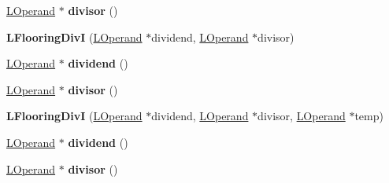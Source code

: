\begin{DoxyCompactItemize}
\item 
\hyperlink{classv8_1_1internal_1_1_l_operand}{L\+Operand} $\ast$ {\bfseries divisor} ()\hypertarget{classv8_1_1internal_1_1_l_flooring_div_i_a08339949c5e8e7eeaaa718262a80085f}{}\label{classv8_1_1internal_1_1_l_flooring_div_i_a08339949c5e8e7eeaaa718262a80085f}

\item 
{\bfseries L\+Flooring\+DivI} (\hyperlink{classv8_1_1internal_1_1_l_operand}{L\+Operand} $\ast$dividend, \hyperlink{classv8_1_1internal_1_1_l_operand}{L\+Operand} $\ast$divisor)\hypertarget{classv8_1_1internal_1_1_l_flooring_div_i_a88e21c324c7b5a3f91e6139b24c0301f}{}\label{classv8_1_1internal_1_1_l_flooring_div_i_a88e21c324c7b5a3f91e6139b24c0301f}

\item 
\hyperlink{classv8_1_1internal_1_1_l_operand}{L\+Operand} $\ast$ {\bfseries dividend} ()\hypertarget{classv8_1_1internal_1_1_l_flooring_div_i_aa8325f9821019c14c21d3db92a6e27bb}{}\label{classv8_1_1internal_1_1_l_flooring_div_i_aa8325f9821019c14c21d3db92a6e27bb}

\item 
\hyperlink{classv8_1_1internal_1_1_l_operand}{L\+Operand} $\ast$ {\bfseries divisor} ()\hypertarget{classv8_1_1internal_1_1_l_flooring_div_i_a08339949c5e8e7eeaaa718262a80085f}{}\label{classv8_1_1internal_1_1_l_flooring_div_i_a08339949c5e8e7eeaaa718262a80085f}

\item 
{\bfseries L\+Flooring\+DivI} (\hyperlink{classv8_1_1internal_1_1_l_operand}{L\+Operand} $\ast$dividend, \hyperlink{classv8_1_1internal_1_1_l_operand}{L\+Operand} $\ast$divisor, \hyperlink{classv8_1_1internal_1_1_l_operand}{L\+Operand} $\ast$temp)\hypertarget{classv8_1_1internal_1_1_l_flooring_div_i_ac86b4e7af079084e1bf5758a9c9ecef1}{}\label{classv8_1_1internal_1_1_l_flooring_div_i_ac86b4e7af079084e1bf5758a9c9ecef1}

\item 
\hyperlink{classv8_1_1internal_1_1_l_operand}{L\+Operand} $\ast$ {\bfseries dividend} ()\hypertarget{classv8_1_1internal_1_1_l_flooring_div_i_aa8325f9821019c14c21d3db92a6e27bb}{}\label{classv8_1_1internal_1_1_l_flooring_div_i_aa8325f9821019c14c21d3db92a6e27bb}

\item 
\hyperlink{classv8_1_1internal_1_1_l_operand}{L\+Operand} $\ast$ {\bfseries divisor} ()\hypertarget{classv8_1_1internal_1_1_l_flooring_div_i_a08339949c5e8e7eeaaa718262a80085f}{}\label{classv8_1_1internal_1_1_l_flooring_div_i_a08339949c5e8e7eeaaa718262a80085f}


\end{DoxyCompactItemize}
